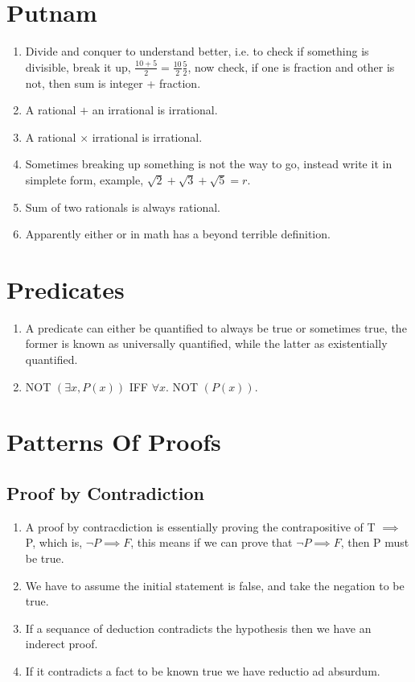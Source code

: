 \documentclass{article}
\DeclareMathOperator{\Exists}{\exists}
\DeclareMathOperator{\Forall}{\forall}
\begin{document}
	\section{Putnam}
	\begin{enumerate}
		\item  Divide and conquer to understand better, i.e. to check if something is divisible, break it up, $\frac{10 + 5}{2} = \frac{10}{2} \frac{5}{2}$, now check, if one is fraction and other is not, then sum is integer + fraction.
		\item A rational $+$ an irrational is irrational.
		\item A rational $\times$ irrational is irrational.
		\item Sometimes breaking up something is not the way to go, instead write it in simplete form, example, $\sqrt{2} + \sqrt{3} + \sqrt{5} = r$.       
		\item Sum of two rationals is always rational.
		\item Apparently either or in math has a beyond terrible definition.
	\end{enumerate}
	\section{Predicates}
	\begin{enumerate}
		\item  A predicate can either be quantified to always be true or  sometimes true, the former is known as universally quantified, while the latter as existentially quantified.
			
		\item NOT $(\Exists x, P(x))$ IFF $\Forall x.$ NOT $(P(x))$.
	\end{enumerate}	
	\section{Patterns Of Proofs}
	\subsection{Proof by Contradiction}
\begin{enumerate}

\item A proof by contracdiction is essentially proving the contrapositive of T $\implies$ P, which is, $\neg P \implies F$, this means if we can prove that $\neg P \implies F$, then P must be true.
\item We have to assume the initial statement is false, and take the negation to be true.
\item If a sequance of deduction contradicts the hypothesis then we have an inderect proof.
\item If it contradicts a fact to be known true we have reductio ad absurdum.
\end{enumerate}
\end{document}
